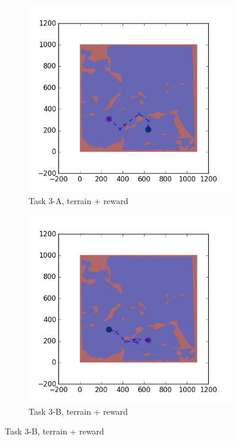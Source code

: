 \documentclass{tamuccthesis}
\begin{document}
\begin{figure}
    \begin{subfigure}[b]{0.4\textwidth}
        \centering
        \includegraphics[width=\textwidth,trim={4cm 3cm 2cm 3cm},clip]{EXP3RG_PathCa_-1_-1_0_-1.png}
        \caption{Task 3-A, terrain + reward}  
        \label{fig:Path_3-A_terrain_reward}
    \end{subfigure}
    \hfill
    \begin{subfigure}[b]{0.4\textwidth}  
        \centering 
        \includegraphics[width=\textwidth,trim={4cm 3cm 2cm 3cm},clip]{EXP3RG_PathCb_-1_-1_0_-1.png}
        \caption{Task 3-B, terrain + reward}
        \label{fig:Path_3-B_terrain_reward}
    \end{subfigure}
    

\end{figure}
\end{document}
